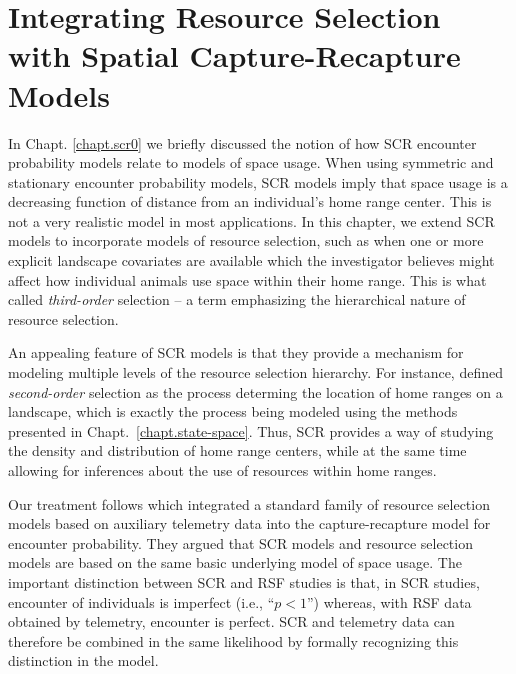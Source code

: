\chapter{
Integrating Resource Selection
with
Spatial Capture-Recapture
Models}

\label{chapt.rsf}

\vspace{.3in}


In Chapt. \ref{chapt.scr0} we briefly discussed the notion of how
SCR encounter probability models relate to models of space usage.
When using symmetric and stationary encounter probability models, SCR
models imply that space usage is a decreasing function of distance
from an individual's home range center. This is not a very realistic
model in most applications.  In this chapter, we extend SCR
models to incorporate models of resource selection,
such as when
one or more explicit landscape covariates are available which the
investigator believes might affect how individual animals use space
within their home range. This is what \citet{johnson:1980} called {\it
  third-order} selection -- a term emphasizing the hierarchical nature
of resource selection.

An appealing feature of SCR models is that
they provide a mechanism for modeling multiple levels of the resource
selection hierarchy. For instance, \citet{johnson:1980} defined
\textit{second-order} selection as the process determing the location of
home ranges on a landscape, which is exactly the process being modeled
using the methods presented in Chapt.~\ref{chapt.state-space}. Thus,
SCR provides a way of studying the density and distribution of home
range centers, while at the
same time allowing for inferences about the use of
resources within home ranges. %


Our treatment follows
\citet{royle_etal:2012mee} which %
integrated a standard family of
resource selection models based on auxiliary telemetry data into the
capture-recapture model for encounter probability.
They  argued that SCR models and resource
selection models \citep{manly_etal:2002} are based on the same basic
underlying model of space usage. The important distinction between SCR
and RSF studies is that, in SCR studies, encounter of individuals is
imperfect (i.e., ``$p<1$'') whereas, with RSF data obtained by
telemetry, encounter is perfect.
SCR and telemetry data %
can
therefore
be combined in the
same likelihood by formally recognizing this distinction in the model.

